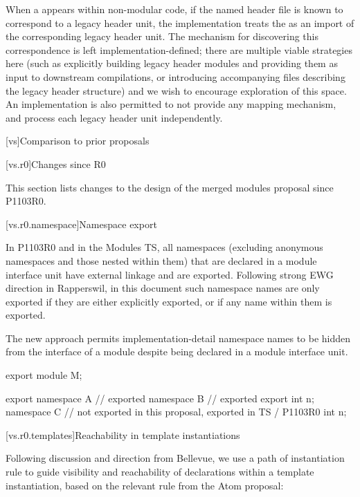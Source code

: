 \pnum
When a  appears within non-modular code,
if the named header file is known to correspond to a legacy header unit,
the implementation treats the  as an import
of the corresponding legacy header unit.
The mechanism for discovering this correspondence
is left implementation-defined;
there are multiple viable strategies here
(such as explicitly building legacy header modules and
providing them as input to downstream compilations, or
introducing accompanying files describing the legacy header structure)
and we wish to encourage exploration of this space.
An implementation is also permitted to not provide any mapping mechanism,
and process each legacy header unit independently.

[vs]{Comparison to prior proposals}

[vs.r0]{Changes since R0}

\pnum
This section lists changes to the design of the merged modules proposal
since P1103R0.

[vs.r0.namespace]{Namespace export}

\pnum
In P1103R0 and in the Modules TS,
all namespaces
(excluding anonymous namespaces and those nested within them)
that are declared in a module interface unit
have external linkage and
are exported.
Following strong EWG direction in Rapperswil,
in this document such namespace names
are only exported if they are either
explicitly exported, or
if any name within them is exported.
\begin{note}
The new approach permits implementation-detail namespace names
to be hidden from the interface of a module
despite being declared in a module interface unit.
\end{note}
\begin{example}
\begin{codeblock}
export module M;

export namespace A {} // exported
namespace B {         // exported
  export int n;
}
namespace C {         // not exported in this proposal, exported in TS / P1103R0
  int n;
}
\end{codeblock}
\end{example}

[vs.r0.templates]{Reachability in template instantiations}

\pnum
Following discussion and direction from Bellevue,
we use a path of instantiation rule to guide
visibility and reachability of declarations
within a template instantiation, based on
the relevant rule from the Atom proposal:

